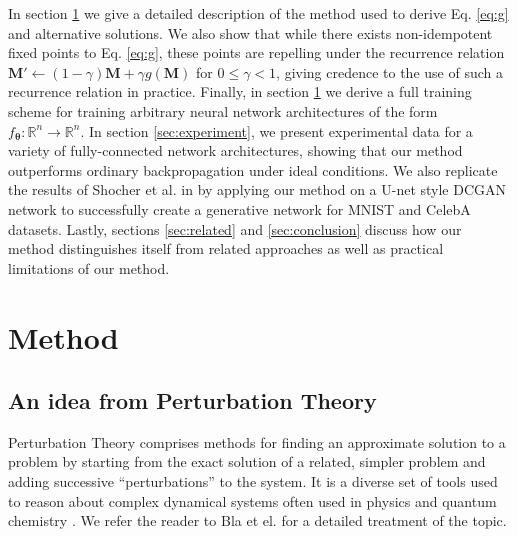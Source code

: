 \documentclass{article}
\newcommand{\vM}{\mathbf{M}}
\newcommand{\vtheta}{\bm{\theta}}
\begin{document}
In section \ref{sec:method} we give a detailed description of the method used to derive Eq. \ref{eq:g} and alternative solutions. We also show that while there exists non-idempotent fixed points to Eq. \ref{eq:g}, these points are repelling under the recurrence relation ${\vM' \leftarrow (1 - \gamma)\vM + \gamma g(\vM)}$ for $0 \leq \gamma < 1$, giving credence to the use of such a recurrence relation in practice. Finally, in section \ref{sec:method} we derive a full training scheme for training arbitrary neural network architectures of the form $f_{\vtheta}: \mathbb{R}^n \to \mathbb{R}^n$. In section \ref{sec:experiment}, we present experimental data for a variety of fully-connected network architectures, showing that our method outperforms ordinary backpropagation under ideal conditions. We also replicate the results of Shocher et al. in \cite{shocher-ign} by applying our method on a U-net style DCGAN network to successfully create a generative network for MNIST and CelebA datasets. Lastly, sections \ref{sec:related} and \ref{sec:conclusion} discuss how our method distinguishes itself from related approaches as well as practical limitations of our method.


\section{Method}
\label{sec:method}




\subsection{An idea from Perturbation Theory}
Perturbation Theory comprises methods for finding an approximate solution to a problem by starting from the exact solution of a related, simpler problem and adding successive ``perturbations'' to the system. It is a diverse set of tools used to reason about complex dynamical systems often used in physics and quantum chemistry \cite{hirschfelder-dev-perturb}. We refer the reader to Bla et el. \cite{intro-pertub-theory} for a detailed treatment of the topic.
\end{document}
